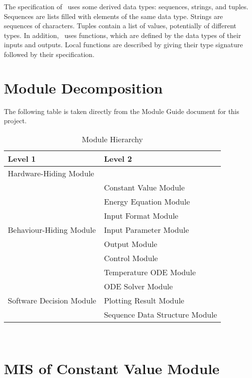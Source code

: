 \documentclass[12pt, titlepage]{article}
\begin{document}
\noindent
The specification of \progname \ uses some derived data types: sequences, strings, and
tuples. Sequences are lists filled with elements of the same data type. Strings
are sequences of characters. Tuples contain a list of values, potentially of
different types. In addition, \progname \ uses functions, which
are defined by the data types of their inputs and outputs. Local functions are
described by giving their type signature followed by their specification.

\section{Module Decomposition}

The following table is taken directly from the Module Guide document for this project.

\begin{table}[h!]
\centering
\begin{tabular}{p{} p{}}
\toprule
\textbf{Level 1} & \textbf{Level 2}\\
\midrule
{Hardware-Hiding Module} & ~ \\
\midrule

\multirow{7}{0.3\textwidth}{Behaviour-Hiding Module} 
& Constant Value Module\\ 
& Energy Equation Module\\
& Input Format Module\\
& Input Parameter Module\\
& Output Module\\
& Control Module\\
& Temperature ODE Module\\
\midrule

\multirow{3}{0.3\textwidth}{Software Decision Module} 
& ODE Solver Module\\
& Plotting Result Module\\
& Sequence Data Structure Module\\
\bottomrule

\end{tabular}
\caption{Module Hierarchy}
\label{TblMH}
\end{table}


\newpage
~\newpage

\section{MIS of Constant Value Module} \label{Constant_Module} 
\end{document}
